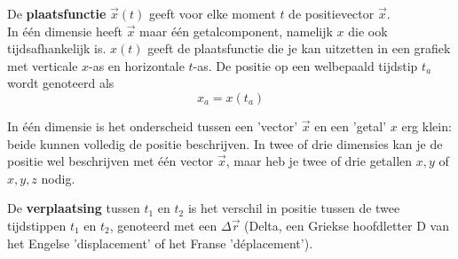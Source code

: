 \documentclass{ximera}
\begin{document}
\begin{definition} 
	De \textbf{plaatsfunctie} \(\vec{x}(t)\) geeft voor elke moment \(t\) de positievector \(\vec{x}\). \\
	In één dimensie heeft \(\vec{x}\) maar één getalcomponent, namelijk \(x\) die ook tijdsafhankelijk is. 
	\(x(t)\) geeft de plaatsfunctie die je kan uitzetten in een grafiek met verticale \(x\)-as en horizontale \(t\)-as. 
	De positie op een welbepaald tijdstip \(t_a\) wordt genoteerd als 
	\[
	x_a = x(t_a)
	\]

\begin{image}[0.3\textwidth]
\end{image}

\end{definition}


\begin{remark} 
	In één dimensie is het onderscheid tussen een 'vector' $\vec{x}$ en een 'getal' $x$ erg klein: beide kunnen volledig de positie beschrijven. 
	In twee of drie dimensies kan je de positie wel beschrijven met één vector $\vec{x}$, maar heb je twee of drie getallen $x,y$ of $x,y,z$ nodig.
\end{remark}
	
De \textbf{verplaatsing} tussen $t_1$ en $t_2$ is het verschil in positie tussen de twee tijdstippen $t_1$ en $t_2$, genoteerd met een $\Delta$\(\vec{r}\) (Delta, een Griekse hoofdletter D  van het Engelse 'displacement' of het Franse 'déplacement').
\end{document}
